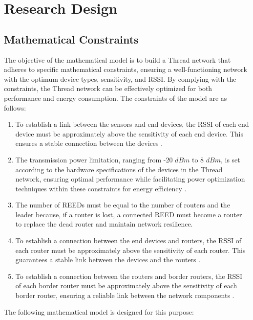 \chapter{Research Design}\label{chap:research_design}

\section{Mathematical Constraints}

The objective of the mathematical model is to build a Thread network that adheres to specific mathematical constraints, ensuring a well-functioning network with the optimum device types, sensitivity, and \gls{RSSI}. By complying with the constraints, the Thread network can be effectively optimized for both performance and energy consumption. The constraints of the model are as follows:

\begin{enumerate}
    \item To establish a link between the sensors and end devices, the \gls{RSSI} of each end device must be approximately above the sensitivity of each end device. This ensures a stable connection between the devices \cite{wu2014study}.
    \item The transmission power limitation, ranging from -20 $dBm$ to 8 $dBm$, is set according to the hardware specifications of the devices in the Thread network, ensuring optimal performance while facilitating power optimization techniques within these constraints for energy efficiency \cite{semiconductor_nrf52840_2018_1}.
    \item The number of \glspl{REED} must be equal to the number of routers and the leader because, if a router is lost, a connected \gls{REED} must become a router to replace the dead router and maintain network resilience.
    \item To establish a connection between the end devices and routers, the \gls{RSSI} of each router must be approximately above the sensitivity of each router. This guarantees a stable link between the devices and the routers \cite{wu2014study}.
    \item To establish a connection between the routers and border routers, the \gls{RSSI} of each border router must be approximately above the sensitivity of each border router, ensuring a reliable link between the network components \cite{wu2014study}.
\end{enumerate}

The following mathematical model is designed for this purpose:

